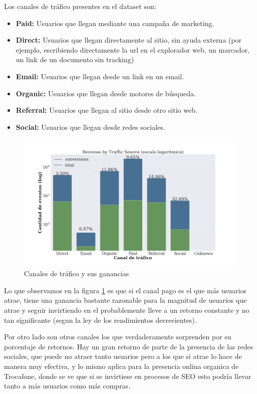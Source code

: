 \documentclass[a4paper]{article}
\begin{document}
Los canales de tráfico presentes en el dataset son:
\begin{itemize}
\item \textbf{Paid: } Usuarios que llegan mediante una campaña de marketing.
\item \textbf{Direct: } Usuarios que llegan directamente al sitio, sin ayuda externa (por ejemplo, escribiendo directamente la url en el explorador web, un marcador, un link de un documento sin tracking)
\item \textbf{Email: } Usuarios que llegan desde un link en un email.
\item \textbf{Organic: } Usuarios que llegan desde motores de búsqueda.
\item \textbf{Referral: } Usuarios que llegan al sitio desde otro sitio web.
\item \textbf{Social: } Usuarios que llegan desde redes sociales.
\end{itemize}

\begin{figure}[h!]
	\includegraphics[width=\linewidth]{figures/180-revenue_traffic-boxplot.png}
	\caption{Canales de tráfico y sus ganancias}
	\label{fig:traffic}
\end{figure}

Lo que observamos en la figura \ref{fig:traffic} es que si el canal pago es el que más usuarios atrae, tiene una ganancia bastante razonable para la magnitud de usuarios que atrae y seguir invirtiendo en el probablemente lleve a un retorno constante y no tan significante (segun la ley de los rendimientos decrecientes). 

Por otro lado son otros canales los que verdaderamente sorprenden por su porcentaje de retornos. Hay un gran retorno de parte de la presencia de las redes sociales, que puede no atraer tanto usuarios pero a los que si atrae lo hace de manera muy efectiva, y lo mismo aplica para la presencia onlina organica de Trocafone, donde se ve que si se invirtiese en procesos de SEO esto podría llevar tanto a más usuarios como más compras.
\end{document}
